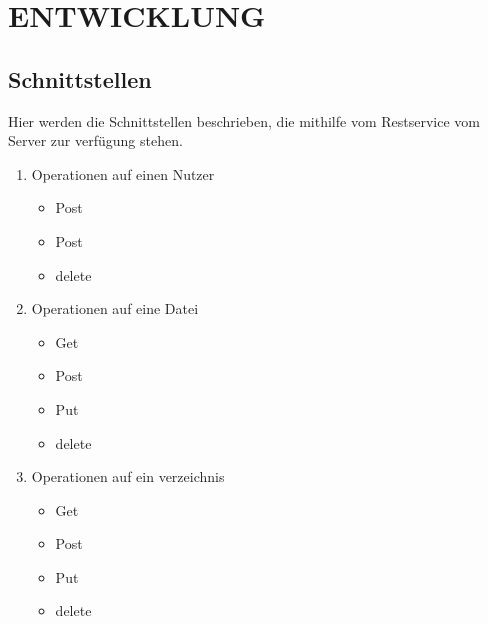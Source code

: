 \section{\uppercase{Entwicklung}}
\subsection{Schnittstellen}
Hier werden die Schnittstellen beschrieben, die mithilfe vom Restservice vom Server zur verf\"ugung stehen.
\begin{enumerate}
\item Operationen auf einen Nutzer
	\begin{itemize}
	\item Post
	\item Post
	\item delete
	\end{itemize}

\item Operationen auf eine Datei
	\begin{itemize}
	\item Get
	\item Post
	\item Put
	\item delete
	\end{itemize}

\item Operationen auf ein verzeichnis
	\begin{itemize}
	\item Get
	\item Post
	\item Put
	\item delete
	\end{itemize}
\end{enumerate}